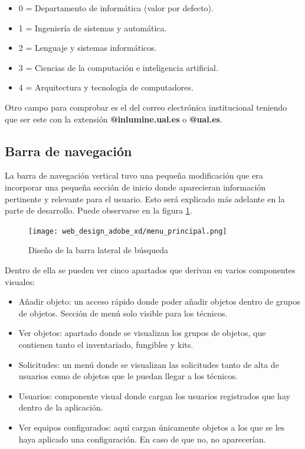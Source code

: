 \begin{itemize}
    \item 0 = Departamento de informática (valor por defecto).
    \item 1 = Ingeniería de sistemas y automática.
    \item 2 = Lenguaje y sistemas informáticos.
    \item 3 = Ciencias de la computación e inteligencia artificial.
    \item 4 = Arquitectura y tecnología de computadores.
\end{itemize}

Otro campo para comprobar es el del correo electrónica institucional teniendo que ser este con la extensión \textbf{@inlumine.ual.es} o \textbf{@ual.es}.

\subsection{Barra de navegación}

La barra de navegación vertical tuvo una pequeña modificación que era incorporar una pequeña sección de inicio donde aparecieran información pertinente y relevante para el usuario. Esto será explicado más adelante en la parte de desarrollo. Puede observarse en la figura \ref{barra_de_navegacion}.

\begin{figure}[ht]
    \begin{center}
        \texttt{[image: web\_design\_adobe\_xd/menu\_principal.png]}
        \caption{Diseño de la barra lateral de búsqueda}\label{barra_de_navegacion}
    \end{center}
\end{figure}

Dentro de ella se pueden ver cinco apartados que derivan en varios componentes visuales:

\begin{itemize}
    \item Añadir objeto: un acceso rápido donde poder añadir objetos dentro de grupos de objetos. Sección de menú solo visible para los técnicos.
    \item Ver objetos: apartado donde se visualizan los grupos de objetos, que contienen tanto el inventariado, fungibles y kits.
    \item Solicitudes: un menú donde se visualizan las solicitudes tanto de alta de usuarios como de objetos que le puedan llegar a los técnicos.
    \item Usuarios: componente visual donde cargan los usuarios registrados que hay dentro de la aplicación.
    \item Ver equipos configurados: aquí cargan únicamente objetos a los que se les haya aplicado una configuración. En caso de que no, no aparecerían.
\end{itemize}

